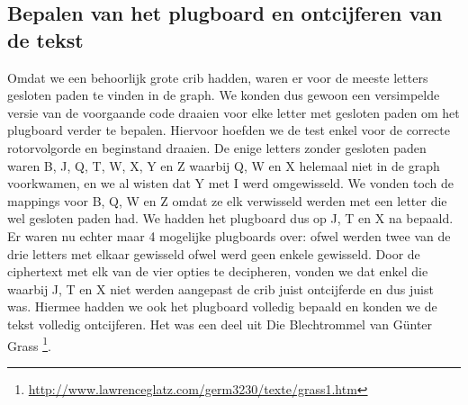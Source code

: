 \subsection{Bepalen van het plugboard en ontcijferen van de tekst}
Omdat we een behoorlijk grote crib hadden, waren er voor de meeste letters gesloten paden te vinden in de graph. We konden dus gewoon een versimpelde versie van de voorgaande code draaien voor elke letter met gesloten paden om het plugboard verder te bepalen. Hiervoor hoefden we de test enkel voor de correcte rotorvolgorde en beginstand draaien. De enige letters zonder gesloten paden waren B, J, Q, T, W, X, Y en Z waarbij Q, W en X helemaal niet in de graph voorkwamen, en we al wisten dat Y met I werd omgewisseld. We vonden toch de mappings voor B, Q, W en Z omdat ze elk verwisseld werden met een letter die wel gesloten paden had. We hadden het plugboard dus op J, T en X na bepaald. Er waren nu echter maar 4 mogelijke plugboards over: ofwel werden twee van de drie letters met elkaar gewisseld ofwel werd geen enkele gewisseld. Door de ciphertext met elk van de vier opties te decipheren, vonden we dat enkel die waarbij J, T en X niet werden aangepast de crib juist ontcijferde en dus juist was. Hiermee hadden we ook het plugboard volledig bepaald en konden we de tekst volledig ontcijferen. Het was een deel uit Die Blechtrommel van G\"unter Grass \footnote{\url{http://www.lawrenceglatz.com/germ3230/texte/grass1.htm}}.



